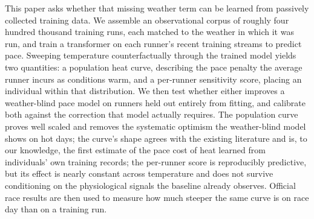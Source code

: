 \documentclass[11pt]{article}
\renewcommand{\_}{\textunderscore\allowbreak}
\begin{document}
This paper asks whether that missing weather term can be learned from passively collected training data. We assemble an observational corpus of roughly four hundred thousand training runs, each matched to the weather in which it was run, and train a transformer on each runner's recent training streams to predict pace. Sweeping temperature counterfactually through the trained model yields two quantities: a population heat curve, describing the pace penalty the average runner incurs as conditions warm, and a per-runner sensitivity score, placing an individual within that distribution. We then test whether either improves a weather-blind pace model on runners held out entirely from fitting, and calibrate both against the correction that model actually requires. The population curve proves well scaled and removes the systematic optimism the weather-blind model shows on hot days; the curve's shape agrees with the existing literature and is, to our knowledge, the first estimate of the pace cost of heat learned from individuals' own training records; the per-runner score is reproducibly predictive, but its effect is nearly constant across temperature and does not survive conditioning on the physiological signals the baseline already observes. Official race results are then used to measure how much steeper the same curve is on race day than on a training run.
\end{document}

